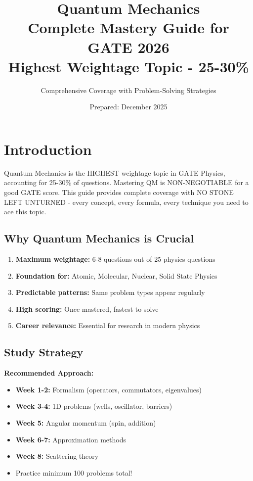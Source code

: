 \documentclass[12pt,a4paper]{article}
\title{\Huge\textbf{Quantum Mechanics}\\[0.3cm]
\Large Complete Mastery Guide for GATE 2026\\[0.2cm]
\large Highest Weightage Topic - 25-30\%}
\author{Comprehensive Coverage with Problem-Solving Strategies}
\date{Prepared: December 2025}
\theoremstyle{definition}
\begin{document}
\maketitle
\newpage

\tableofcontents
\newpage

\section{Introduction}

\begin{importantbox}
Quantum Mechanics is the HIGHEST weightage topic in GATE Physics, accounting for 25-30\% of questions. Mastering QM is NON-NEGOTIABLE for a good GATE score. This guide provides complete coverage with NO STONE LEFT UNTURNED - every concept, every formula, every technique you need to ace this topic.
\end{importantbox}

\subsection{Why Quantum Mechanics is Crucial}

\begin{enumerate}
    \item \textbf{Maximum weightage:} 6-8 questions out of 25 physics questions
    \item \textbf{Foundation for:} Atomic, Molecular, Nuclear, Solid State Physics
    \item \textbf{Predictable patterns:} Same problem types appear regularly
    \item \textbf{High scoring:} Once mastered, fastest to solve
    \item \textbf{Career relevance:} Essential for research in modern physics
\end{enumerate}

\subsection{Study Strategy}

\begin{tipbox}
\textbf{Recommended Approach:}
\begin{itemize}
    \item \textbf{Week 1-2:} Formalism (operators, commutators, eigenvalues)
    \item \textbf{Week 3-4:} 1D problems (wells, oscillator, barriers)
    \item \textbf{Week 5:} Angular momentum (spin, addition)
    \item \textbf{Week 6-7:} Approximation methods
    \item \textbf{Week 8:} Scattering theory
    \item Practice minimum 100 problems total!
\end{itemize}
\end{tipbox}
\end{document}
